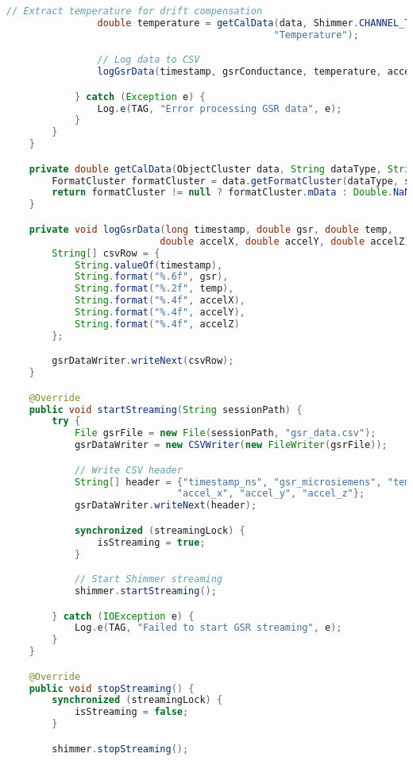 \begin{lstlisting}[language=Java, caption=Shimmer GSR Sensor Integration]
                // Extract temperature for drift compensation
                double temperature = getCalData(data, Shimmer.CHANNEL_TYPE.CAL.toString(),
                                               "Temperature");

                // Log data to CSV
                logGsrData(timestamp, gsrConductance, temperature, accelX, accelY, accelZ);

            } catch (Exception e) {
                Log.e(TAG, "Error processing GSR data", e);
            }
        }
    }

    private double getCalData(ObjectCluster data, String dataType, String sensorName) {
        FormatCluster formatCluster = data.getFormatCluster(dataType, sensorName);
        return formatCluster != null ? formatCluster.mData : Double.NaN;
    }

    private void logGsrData(long timestamp, double gsr, double temp,
                           double accelX, double accelY, double accelZ) {
        String[] csvRow = {
            String.valueOf(timestamp),
            String.format("%.6f", gsr),
            String.format("%.2f", temp),
            String.format("%.4f", accelX),
            String.format("%.4f", accelY),
            String.format("%.4f", accelZ)
        };

        gsrDataWriter.writeNext(csvRow);
    }

    @Override
    public void startStreaming(String sessionPath) {
        try {
            File gsrFile = new File(sessionPath, "gsr_data.csv");
            gsrDataWriter = new CSVWriter(new FileWriter(gsrFile));

            // Write CSV header
            String[] header = {"timestamp_ns", "gsr_microsiemens", "temperature_c",
                              "accel_x", "accel_y", "accel_z"};
            gsrDataWriter.writeNext(header);

            synchronized (streamingLock) {
                isStreaming = true;
            }

            // Start Shimmer streaming
            shimmer.startStreaming();

        } catch (IOException e) {
            Log.e(TAG, "Failed to start GSR streaming", e);
        }
    }

    @Override
    public void stopStreaming() {
        synchronized (streamingLock) {
            isStreaming = false;
        }

        shimmer.stopStreaming();


\end{lstlisting}
